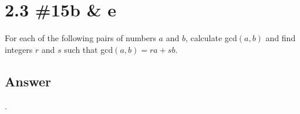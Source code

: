 \documentclass[
	12pt, %
]{fphw}
\begin{document}
\section*{2.3 \#15b \& e}

\begin{problem}
For each of the following pairs of numbers $a$ and $b$, calculate gcd$(a, b)$
and find integers $r$ and $s$ such that gcd$(a, b) = ra + sb$.\end{problem}


\subsection*{Answer} .\\

\end{document}
